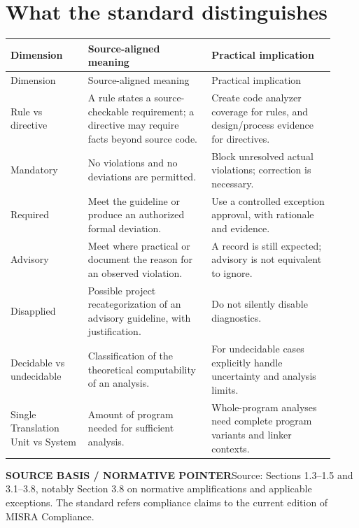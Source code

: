 \documentclass[10pt,letterpaper]{article}
\newcommand{\SourceNote}[1]{\begin{sourcebox}\textbf{SOURCE BASIS / NORMATIVE POINTER}\quad #1\end{sourcebox}}
\begin{document}
\section{What the standard distinguishes}
\small\setlength{\tabcolsep}{3pt}\renewcommand{\arraystretch}{1.15}
\begin{longtable}{p{0.22\linewidth}p{0.35\linewidth}p{0.35\linewidth}}
\toprule
Dimension & Source-aligned meaning & Practical implication\\ \midrule
\endfirsthead
\toprule
Dimension & Source-aligned meaning & Practical implication\\ \midrule
\endhead
Rule vs directive & A rule states a source-checkable requirement; a directive may require facts beyond source code. & Create code analyzer coverage for rules, and design/process evidence for directives.\\
Mandatory & No violations and no deviations are permitted. & Block unresolved actual violations; correction is necessary.\\
Required & Meet the guideline or produce an authorized formal deviation. & Use a controlled exception approval, with rationale and evidence.\\
Advisory & Meet where practical or document the reason for an observed violation. & A record is still expected; advisory is not equivalent to ignore.\\
Disapplied & Possible project recategorization of an advisory guideline, with justification. & Do not silently disable diagnostics.\\
Decidable vs undecidable & Classification of the theoretical computability of an analysis. & For undecidable cases explicitly handle uncertainty and analysis limits.\\
Single Translation Unit vs System & Amount of program needed for sufficient analysis. & Whole-program analyses need complete program variants and linker contexts.\\
\bottomrule
\end{longtable}
\normalsize
\SourceNote{Source: Sections 1.3--1.5 and 3.1--3.8, notably Section 3.8 on normative amplifications and applicable exceptions. The standard refers compliance claims to the current edition of MISRA Compliance.}
\end{document}

